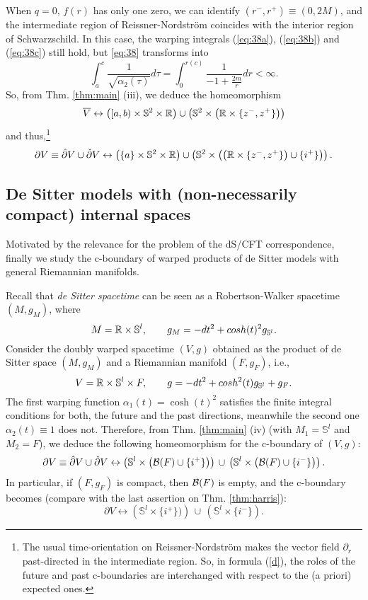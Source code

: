 When $q=0$, $f(r)$ has only one zero, we can identify $(r^-,r^+)\equiv (0,2M)$, and the intermediate region of Reissner-Nordstr\"om coincides with the interior region of Schwarzschild. In this case, the warping integrals (\ref{eq:38a}), (\ref{eq:38b}) and (\ref{eq:38c}) still hold, but \eqref{eq:38} transforms into
  \[
\int_{a}^{c}\frac{1}{\sqrt{\alpha_2(\tau)}}d\tau = \int_{0}^{r(c)}\frac{1}{-1+\frac{2m}{r}}dr<\infty.
  \]
  So, from Thm. \ref{thm:main} (iii), we deduce the homeomorphism
  \[
\overline{V}\leftrightarrow \left([a,b)\times \mathbb{S}^2\times {\mathbb R}\right) \cup \left( \mathbb{S}^2\times \left({\mathbb R}\times \{z^-,z^+\} \right)\right)
    \]
  and thus,\footnote{The usual time-orientation on Reissner-Nordstr\"om makes the vector field $\partial_r$ past-directed in the intermediate region. So, in formula (\ref{d}), the roles of the future and past c-boundaries are interchanged with respect to the (a priori) expected ones.}
 \begin{equation}\label{d}
  \partial V\equiv \hat{\partial} V\cup \check{\partial} V \leftrightarrow  \left(\{a\}\times \mathbb{S}^2\times {\mathbb R}   \right) \cup \left(\mathbb{S}^2\times \left( \left({\mathbb R}\times \{z^-,z^+\}\right)\cup \{i^+\} \right)\right).
  \end{equation}

\subsection*{De Sitter models with (non-necessarily compact) internal spaces}

Motivated by the relevance for the problem of the dS/CFT correspondence, finally we study the c-boundary of warped products of de Sitter models with general Riemannian manifolds.

Recall that {\em de Sitter spacetime} can be seen as a Robertson-Walker spacetime $(M,g_{M})$, where
\[
M={\mathbb R}\times \mathbb{S}^l,\qquad g_{M}=-dt^2 + cosh(t)^2 g_{\mathbb{S}^l}.
  \]
Consider the doubly warped spacetime $(V,g)$ obtained as the product of de Sitter space $(M,g_{M})$ and a Riemannian manifold $(F,g_{F})$, i.e.,
  \[V={\mathbb R}\times \mathbb{S}^l\times F,\qquad g=-dt^2+cosh^2(t)g_{\mathbb{S}^{l}}+g_{F}.
    \]
  The first warping function $\alpha_1(t)=\cosh(t)^2$ satisfies the finite integral conditions for both, the future and the past directions, meanwhile the second one $\alpha_2(t)\equiv 1$ does not. Therefore, from Thm. \ref{thm:main} (iv) (with $M_1=\mathbb{S}^l$ and $M_2=F$), we deduce the following homeomorphism for the c-boundary of $(V,g)$:
\[
\partial {V}\equiv \hat{\partial} V \cup \check{\partial} V \leftrightarrow  \left(\mathbb{S}^l\times \left({\cal B}(F)\cup \{i^+\}\right) \right)\,  \cup \, \left(\mathbb{S}^l\times \left({\cal B}(F)\cup \{i^-\}\right) \right).
\]
  In particular, if $(F,g_{F})$ is compact, then ${\cal B}(F)$ is empty, and the c-boundary becomes (compare with the last assertion on Thm. \ref{thm:harris}):
\[
  \partial V\leftrightarrow \left(\mathbb{S}^l\times \{i^+\}) \right)\,  \cup \, \left(\mathbb{S}^l\times \{i^-\} \right).
  \]

